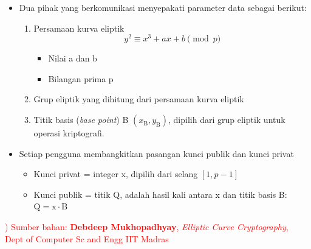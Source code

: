 \documentclass{article}
\begin{document}

\begin{itemize}
    \item Dua pihak yang berkomunikasi menyepakati parameter data sebagai berikut:
    \begin{enumerate}
        \item Persamaan kurva eliptik \[ y^2 \equiv x^3 + ax + b \pmod{p} \]
        \begin{itemize}
            \item Nilai a dan b
            \item Bilangan prima p
        \end{itemize}
        \item Grup eliptik yang dihitung dari persamaan kurva eliptik
        \item Titik basis (\textit{base point}) B $(x_{\text{B}}, y_{\text{B}})$, dipilih dari grup eliptik untuk operasi kriptografi.
    \end{enumerate}
\end{itemize}

\begin{itemize}
    \item Setiap pengguna membangkitkan pasangan kunci publik dan kunci privat
    \begin{itemize}
        \item Kunci privat = integer x, dipilih dari selang $[1, p - 1]$
        \item Kunci publik = titik Q, adalah hasil kali antara x dan titik basis B: $\text{Q} = \text{x} \cdot \text{B}$
    \end{itemize}
\end{itemize}

\vfill
\raggedleft
\textcolor{red}{\small *) Sumber bahan: \textbf{Debdeep Mukhopadhyay}, \textit{Elliptic Curve Cryptography}, \\ Dept of Computer Sc and Engg IIT Madras}
\end{document}
